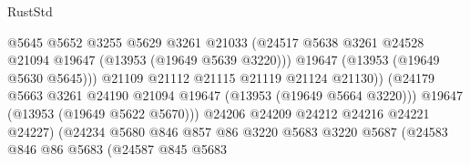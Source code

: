 \begin{lexlean}{RustStd}
\begin{coremodule}
                                              @5645
                                              @5652
                                              @3255
                                              @5629
                                              @3261
                                              @21033
                                              (@24517
                                                @5638
                                                @3261
                                                @24528
                                                @21094
                                                @19647
                                                (@13953 (@19649 @5639 @3220)))
                                              @19647
                                              (@13953 (@19649 @5630 @5645)))
                                            @21109
                                            @21112
                                            @21115
                                            @21119
                                            @21124
                                            @21130))
                                        (@24179
                                          @5663
                                          @3261
                                          @24190
                                          @21094
                                          @19647
                                          (@13953 (@19649 @5664 @3220)))
                                        @19647
                                        (@13953 (@19649 @5622 @5670)))
                                      @24206
                                      @24209
                                      @24212
                                      @24216
                                      @24221
                                      @24227)
                                    (@24234
                                      @5680
                                      @846
                                      @857
                                      @86
                                      @3220
                                      @5683
                                      @3220
                                      @5687
                                      (@24583
                                        @846
                                        @86
                                        @5683
                                        (@24587
                                          @845
                                          @5683

\end{coremodule}
\end{lexlean}
